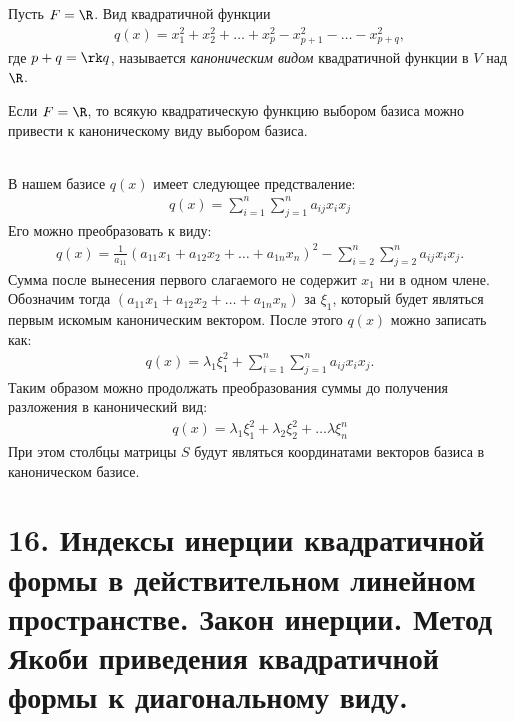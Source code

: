 \begin{definition}
    Пусть $F = \R$. Вид квадратичной функции
    \begin{align*}
        q(x) = x_1^2 + x_2^2 + \dots + x_p^2 - x_{p+1}^2 - \dots - x_{p+q}^2,
    \end{align*} 
    где $p + q = \rk q$, называется \textit{каноническим видом} квадратичной функции в $V$ над $\R$.
\end{definition}

\begin{corollary}
    Если $F = \R$, то всякую квадратическую функцию выбором базиса можно привести к каноническому виду 
    выбором базиса.
\end{corollary}

\begin{algorithm}~\\
    В нашем базисе $q(x)$ имеет следующее предстваление:
    \begin{gather*}
        q(x) = \sum_{i=1}^{n}\sum_{j=1}^{n} a_{ij}x_i x_j
    \end{gather*}
    Его можно преобразовать к виду: 
    \begin{gather*}
        q(x) = \frac{1}{a_{11}} (a_{11} x_1 + a_{12} x_2 + \dots + a_{1n} x_n)^2 - 
        \sum_{i=2}^{n}\sum_{j=2}^{n} a_{ij}x_i x_j.
    \end{gather*}
    Сумма после вынесения первого слагаемого не содержит $x_1$ ни в одном члене. Обозначим тогда 
    $(a_{11} x_1 + a_{12} x_2 + \dots + a_{1n} x_n)$ за $\xi_1$, который будет являться первым 
    искомым каноническим вектором. После этого $q(x)$ можно записать как:
    \begin{gather*}
        q(x) = \lambda_1  \xi_1^2 + \sum_{i=1}^{n}\sum_{j=1}^{n} a_{ij}x_i x_j.
    \end{gather*}
    Таким образом можно продолжать преобразования суммы до получения разложения в канонический вид:
    \begin{gather*}
        q(x) = \lambda_1  \xi_1^2 + \lambda_2 \xi_2^2 + \dots \lambda \xi_n^n
    \end{gather*}
    При этом столбцы матрицы $S$ будут являться координатами векторов базиса в каноническом базисе.
\end{algorithm}

\section{16. Индексы инерции квадратичной формы в действительном линейном пространстве. Закон инерции. Метод Якоби приведения квадратичной формы к диагональному виду.}

